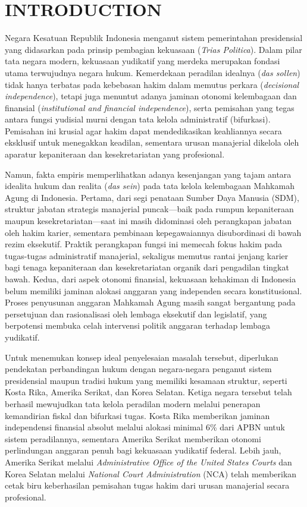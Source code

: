 \documentclass[12pt, a4paper]{article}
\begin{document}
\vspace{2em}

\section{INTRODUCTION}

Negara Kesatuan Republik Indonesia menganut sistem pemerintahan presidensial yang didasarkan pada prinsip pembagian kekuasaan (\textit{Trias Politica}). Dalam pilar tata negara modern, kekuasaan yudikatif yang merdeka merupakan fondasi utama terwujudnya negara hukum. Kemerdekaan peradilan idealnya (\textit{das sollen}) tidak hanya terbatas pada kebebasan hakim dalam memutus perkara (\textit{decisional independence}), tetapi juga menuntut adanya jaminan otonomi kelembagaan dan finansial (\textit{institutional and financial independence}), serta pemisahan yang tegas antara fungsi yudisial murni dengan tata kelola administratif (bifurkasi). Pemisahan ini krusial agar hakim dapat mendedikasikan keahliannya secara eksklusif untuk menegakkan keadilan, sementara urusan manajerial dikelola oleh aparatur kepaniteraan dan kesekretariatan yang profesional.

Namun, fakta empiris memperlihatkan adanya kesenjangan yang tajam antara idealita hukum dan realita (\textit{das sein}) pada tata kelola kelembagaan Mahkamah Agung di Indonesia. Pertama, dari segi penataan Sumber Daya Manusia (SDM), struktur jabatan strategis manajerial puncak—baik pada rumpun kepaniteraan maupun kesekretariatan—saat ini masih didominasi oleh perangkapan jabatan oleh hakim karier, sementara pembinaan kepegawaiannya disubordinasi di bawah rezim eksekutif. Praktik perangkapan fungsi ini memecah fokus hakim pada tugas-tugas administratif manajerial, sekaligus memutus rantai jenjang karier bagi tenaga kepaniteraan dan kesekretariatan organik dari pengadilan tingkat bawah. Kedua, dari aspek otonomi finansial, kekuasaan kehakiman di Indonesia belum memiliki jaminan alokasi anggaran yang independen secara konstitusional. Proses penyusunan anggaran Mahkamah Agung masih sangat bergantung pada persetujuan dan rasionalisasi oleh lembaga eksekutif dan legislatif, yang berpotensi membuka celah intervensi politik anggaran terhadap lembaga yudikatif.

Untuk menemukan konsep ideal penyelesaian masalah tersebut, diperlukan pendekatan perbandingan hukum dengan negara-negara penganut sistem presidensial maupun tradisi hukum yang memiliki kesamaan struktur, seperti Kosta Rika, Amerika Serikat, dan Korea Selatan. Ketiga negara tersebut telah berhasil mewujudkan tata kelola peradilan modern melalui penerapan kemandirian fiskal dan bifurkasi tugas. Kosta Rika memberikan jaminan independensi finansial absolut melalui alokasi minimal 6\% dari APBN untuk sistem peradilannya, sementara Amerika Serikat memberikan otonomi perlindungan anggaran penuh bagi kekuasaan yudikatif federal. Lebih jauh, Amerika Serikat melalui \textit{Ad\-mi\-nis\-tra\-tive Office of the United States Courts} dan Korea Selatan melalui \textit{Na\-tion\-al Court Ad\-mi\-nis\-tra\-tion} (NCA) telah memberikan cetak biru keberhasilan pemisahan tugas hakim dari urusan manajerial secara profesional.
\end{document}
